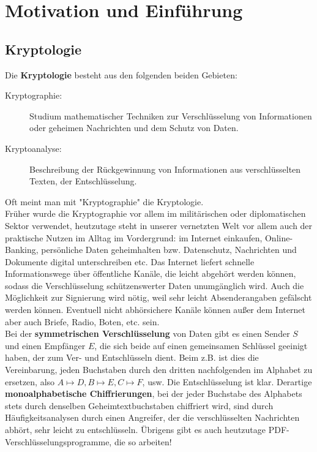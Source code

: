 \setcounter{section}{-1}
\section{Motivation und Einführung}
\label{sec:para0}

\nextlecture
\subsection*{Kryptologie}
	Die \textbf{Kryptologie} besteht aus den folgenden beiden Gebieten: \marginnote{[1]} 
	\begin{description}
		\item[Kryptographie:] Studium mathematischer Techniken zur Verschlüsselung von Informationen oder geheimen Nachrichten und dem Schutz von Daten.
		\item[Kryptoanalyse:] Beschreibung der Rückgewinnung von Informationen aus verschlüsselten Texten, der Entschlüsselung.
	\end{description}
Oft meint man mit "Kryptographie" die Kryptologie. \\

Früher wurde die Kryptographie vor allem im militärischen oder diplomatischen Sektor verwendet, heutzutage steht in unserer vernetzten Welt vor allem auch der praktische Nutzen im Alltag im Vordergrund: im Internet einkaufen, Online-Banking, persönliche Daten geheimhalten bzw. Datenschutz, Nachrichten und Dokumente digital unterschreiben etc. 
Das Internet liefert schnelle Informationswege über öffentliche Kanäle, die leicht abgehört werden können, sodass die Verschlüsselung schützenswerter Daten unumgänglich wird. 
Auch die Möglichkeit zur Signierung wird nötig, weil sehr leicht Absenderangaben gefälscht werden können. 
Eventuell nicht abhörsichere Kanäle können außer dem Internet aber auch Briefe, Radio, Boten, etc. sein. \\

Bei der \textbf{symmetrischen Verschlüsselung} von Daten gibt es einen Sender $S$ und einen Empfänger $E$, die sich beide auf einen gemeinsamen Schlüssel geeinigt haben, der zum Ver- und Entschlüsseln dient. 
Beim  z.B. ist dies die Vereinbarung, jeden Buchstaben durch den dritten nachfolgenden im Alphabet zu ersetzen, also $A \mapsto D, B \mapsto E, C \mapsto F$, usw. 
Die Entschlüsselung ist klar. 
Derartige \textbf{monoalphabetische Chiffrierungen}, bei der jeder Buchstabe des Alphabets stets durch denselben Geheimtextbuchstaben chiffriert wird, sind durch Häufigkeitsanalysen durch einen Angreifer, der die verschlüsselten Nachrichten abhört, sehr leicht zu entschlüsseln. 
Übrigens gibt es auch heutzutage PDF-Verschlüsselungsprogramme, die so arbeiten! 

